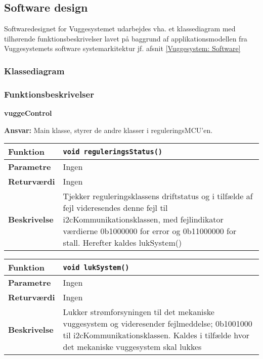 \newpage
\subsection{Software design}
Softwaredesignet for Vuggesystemet udarbejdes vha. et klassediagram med tilhørende funktionsbeskrivelser lavet på baggrund af applikationsmodellen fra Vuggesystemets software systemarkitektur jf. afsnit \ref{Vuggesystem: Software}

\subsubsection*{Klassediagram}

\subsubsection*{Funktionsbeskrivelser}
{\centering
\textbf{vuggeControl}\par
}
\textbf{Ansvar:} Main klasse, styrer de andre klasser i reguleringsMCU'en. \

\begin{center}
    \begin{tabular}{ | l | p{} |}
    \hline
    \textbf{Funktion}	& \verb+void reguleringsStatus() +						\\ \hline
    \textbf{Parametre} 	& Ingen		\\ \hline
    \textbf{Returværdi}	& Ingen 								\\ \hline
    \textbf{Beskrivelse}	& Tjekker reguleringsklassens driftstatus og i tilfælde af fejl videresendes denne fejl til i2cKommunikationsklassen, med fejlindikator værdierne 0b1000000 for error og 0b11000000 for stall. Herefter kaldes lukSystem()		\\ \hline
    \end{tabular}
\end{center}

\begin{center}
    \begin{tabular}{ | l | p{} |}
    \hline
    \textbf{Funktion}	& \verb+void lukSystem() +						\\ \hline
    \textbf{Parametre} 	& Ingen		\\ \hline
    \textbf{Returværdi}	& Ingen 								\\ \hline
    \textbf{Beskrivelse}	& Lukker strømforsyningen til det mekaniske vuggesystem og videresender fejlmeddelse; 0b1001000 til i2cKommunikationsklassen. Kaldes i tilfælde hvor det mekaniske vuggesystem skal lukkes		\\ \hline
    \end{tabular}
\end{center}

